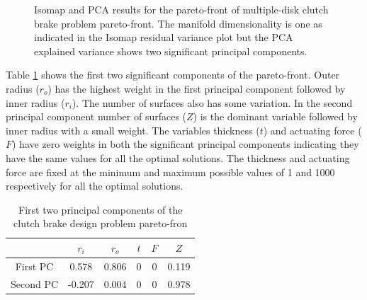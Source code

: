 \begin{figure}[ht]\begin{center}
\caption{Isomap and PCA results for the pareto-front of multiple-disk
  clutch brake problem pareto-front. The manifold dimensionality is one as
  indicated in the Isomap residual variance plot but the PCA explained
  variance shows two significant principal components.}
 \label{clutchWholeVar}
\end{center}\end{figure}

Table \ref{first2clutchPCs} shows the first two significant components of
the pareto-front. Outer radius ($r_o$) has the highest weight in the
first principal component followed by inner radius ($r_i$). The number of
surfaces also has some variation. In the second principal component number
of surfaces ($Z$) is the dominant variable followed by inner radius with a
small weight. The variables thickness ($t$) and actuating force ($F$)
have zero weights in both the significant principal components indicating
they have the same values for all the optimal solutions. The thickness and
actuating force are fixed at the minimum and maximum possible values of 1
and 1000 respectively for all the optimal solutions.


\begin{table}[!ht]
  \centering
  \begin{tabular}{c|c|c|c|c|c|}
    \cline{2-6}
    & $r_{i}$ & $r_{o}$ & $ t $  & $F$ & $Z$ \\
    \hline
    \multicolumn{1}{|c|}{First PC} & 0.578 & 0.806 & 0 & 0 & 0.119\\
    \hline
    \multicolumn{1}{|c|}{Second PC} & -0.207 & 0.004 & 0 & 0 & 0.978\\
    \hline
  \end{tabular}
  \caption{First two principal components of the clutch brake design problem pareto-fron}
  \label{first2clutchPCs}
\end{table}

